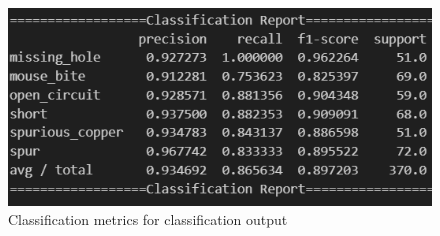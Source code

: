 \documentclass[12pt]{article}
\begin{document}
\clearpage

\begin{figure}[H]
    \centering
    \includegraphics[width=1\textwidth]{./graphics/classification_report_yolo.png}
    \caption{Classification metrics for classification output}
    \label{fig:classification_report_yolo}
\end{figure}

\clearpage
\end{document}
